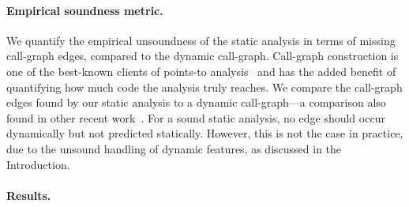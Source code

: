 


\paragraph{Empirical soundness metric.}
We quantify the empirical unsoundness of the static analysis in terms
of missing call-graph edges, compared to the dynamic
call-graph. Call-graph construction is one of the best-known clients
of points-to analysis~\cite{ecoop/AliL12,ecoop/AliL13,ecoop/LiTSX14}
and has the added benefit of quantifying how much code the analysis
truly reaches. We compare the call-graph edges found by our static
analysis to a dynamic call-graph---a comparison also found in other
recent work~\cite{pppj/StancuWBLF14}. For a sound static analysis, no
edge should occur dynamically but not predicted statically. However,
this is not the case in practice, due to the unsound handling of
dynamic features, as discussed in the Introduction.

\paragraph{Results.}


